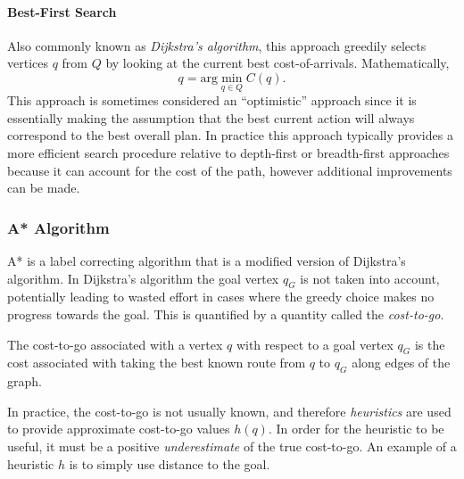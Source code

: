\paragraph{Best-First Search}
Also commonly known as \textit{Dijkstra’s algorithm}, this approach greedily selects vertices $q$ from $Q$ by looking at the current best cost-of-arrivals. Mathematically,
\begin{equation*}
   q = \textrm{arg} \min_{q \in Q} C(q).
\end{equation*}
This approach is sometimes considered an ``optimistic'' approach since it is essentially making the assumption that the best current action will always correspond to the best overall plan.
In practice this approach typically provides a more efficient search procedure relative to depth-first or breadth-first approaches because it can account for the cost of the path, however additional improvements can be made.

\subsubsection{A* Algorithm}
A* is a label correcting algorithm that is a modified version of Dijkstra's algorithm. In Dijkstra's algorithm the goal vertex $q_G$ is not taken into account, potentially leading to wasted effort in cases where the greedy choice makes no progress towards the goal. This is quantified by a quantity called the \textit{cost-to-go}.

\begin{definition}[Cost-to-Go]
The cost-to-go associated with a vertex $q$ with respect to a goal vertex $q_G$ is the cost associated with taking the best known route from $q$ to $q_G$ along edges of the graph.
\end{definition}
In practice, the cost-to-go is not usually known, and therefore \textit{heuristics} are used to provide approximate cost-to-go values $h(q)$. In order for the heuristic to be useful, it must be a positive \textit{underestimate} of the true cost-to-go. An example of a heuristic $h$ is to simply use distance to the goal.

